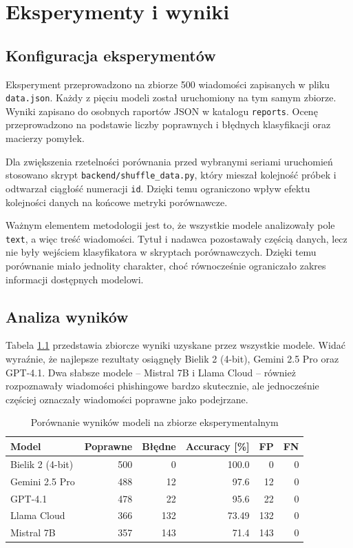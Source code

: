 \documentclass[12pt,a4paper,openright]{report}
\begin{document}
\chapter{Eksperymenty i wyniki}

\section{Konfiguracja eksperymentów}

Eksperyment przeprowadzono na zbiorze 500 wiadomości zapisanych w pliku \texttt{data.json}. Każdy z pięciu modeli został uruchomiony na tym samym zbiorze. Wyniki zapisano do osobnych raportów JSON w katalogu \texttt{reports}. Ocenę przeprowadzono na podstawie liczby poprawnych i błędnych klasyfikacji oraz macierzy pomyłek.

Dla zwiększenia rzetelności porównania przed wybranymi seriami uruchomień stosowano skrypt \texttt{backend/shuffle\_data.py}, który mieszał kolejność próbek i odtwarzał ciągłość numeracji \texttt{id}. Dzięki temu ograniczono wpływ efektu kolejności danych na końcowe metryki porównawcze.

Ważnym elementem metodologii jest to, że wszystkie modele analizowały pole \texttt{text}, a więc treść wiadomości. Tytuł i nadawca pozostawały częścią danych, lecz nie były wejściem klasyfikatora w skryptach porównawczych. Dzięki temu porównanie miało jednolity charakter, choć równocześnie ograniczało zakres informacji dostępnych modelowi.

\section{Analiza wyników}

Tabela \ref{tab:model-results} przedstawia zbiorcze wyniki uzyskane przez wszystkie modele. Widać wyraźnie, że najlepsze rezultaty osiągnęły Bielik 2 (4-bit), Gemini 2.5 Pro oraz GPT-4.1. Dwa słabsze modele -- Mistral 7B i Llama Cloud -- również rozpoznawały wiadomości phishingowe bardzo skutecznie, ale jednocześnie częściej oznaczały wiadomości poprawne jako podejrzane.

\begin{table}[H]
    \centering
    \small
    \begin{tabular}{l r r r r r}
        \toprule
        Model & Poprawne & Błędne & Accuracy [\%] & FP & FN \\
        \midrule
        Bielik 2 (4-bit) & 500 & 0 & 100.0 & 0 & 0 \\
        Gemini 2.5 Pro & 488 & 12 & 97.6 & 12 & 0 \\
        GPT-4.1 & 478 & 22 & 95.6 & 22 & 0 \\
        Llama Cloud & 366 & 132 & 73.49 & 132 & 0 \\
        Mistral 7B & 357 & 143 & 71.4 & 143 & 0 \\
        \bottomrule
    \end{tabular}
    \caption{Porównanie wyników modeli na zbiorze eksperymentalnym}
    \label{tab:model-results}
\end{table}
\end{document}
